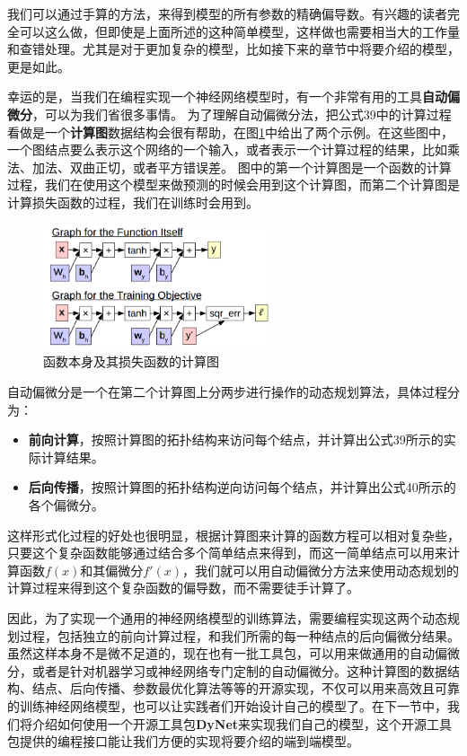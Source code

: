 \documentclass[10pt,a4paper]{ctexart}
\begin{document}
我们可以通过手算的方法，来得到模型的所有参数的精确偏导数。有兴趣的读者完全可以这么做，但即使是上面所述的这种简单模型，这样做也需要相当大的工作量和查错处理。尤其是对于更加复杂的模型，比如接下来的章节中将要介绍的模型，更是如此。

幸运的是，当我们在编程实现一个神经网络模型时，有一个非常有用的工具\textbf{自动偏微分}\cite{wengert1964simple,andreas1991dif}，可以为我们省很多事情。
为了理解自动偏微分法，把公式39中的计算过程看做是一个\textbf{计算图}数据结构会很有帮助，在图\ref{fig:10}中给出了两个示例。在这些图中，一个图结点要么表示这个网络的一个输入，或者表示一个计算过程的结果，比如乘法、加法、双曲正切，或者平方错误差。
图中的第一个计算图是一个函数的计算过程，我们在使用这个模型来做预测的时候会用到这个计算图，而第二个计算图是计算损失函数的过程，我们在训练时会用到。

\begin{figure}[H]
\centering
\includegraphics[width=0.6\textwidth]{fig10.png}
\caption{函数本身及其损失函数的计算图}
\label{fig:10}
\end{figure}

自动偏微分是一个在第二个计算图上分两步进行操作的动态规划算法，具体过程分为：
\begin{itemize}
\item \textbf{前向计算}，按照计算图的拓扑结构来访问每个结点，并计算出公式39所示的实际计算结果。
\item \textbf{后向传播}，按照计算图的拓扑结构逆向访问每个结点，并计算出公式40所示的各个偏微分。
\end{itemize}
这样形式化过程的好处也很明显，根据计算图来计算的函数方程可以相对复杂些，只要这个复杂函数能够通过结合多个简单结点来得到，而这一简单结点可以用来计算函数$f(x)$和其偏微分$f'(x)$，我们就可以用自动偏微分方法来使用动态规划的计算过程来得到这个复杂函数的偏导数，而不需要徒手计算了。

因此，为了实现一个通用的神经网络模型的训练算法，需要编程实现这两个动态规划过程，包括独立的前向计算过程，和我们所需的每一种结点的后向偏微分结果。虽然这样本身不是微不足道的，现在也有一批工具包，可以用来做通用的自动偏微分\cite{bendtsen1996fadbad,hogan2014fast}，或者是针对机器学习或神经网络专门定制的自动偏微分\cite{abadi2016tensorflow,bergstra2010theano,collobert2002torch,tokui2015chainer,neubig2017dynet}。这种计算图的数据结构、结点、后向传播、参数最优化算法等等的开源实现，不仅可以用来高效且可靠的训练神经网络模型，也可以让实践者们开始设计自己的模型了。在下一节中，我们将介绍如何使用一个开源工具包\textbf{DyNet}来实现我们自己的模型，这个开源工具包提供的编程接口能让我们方便的实现将要介绍的端到端模型。
\end{document}
